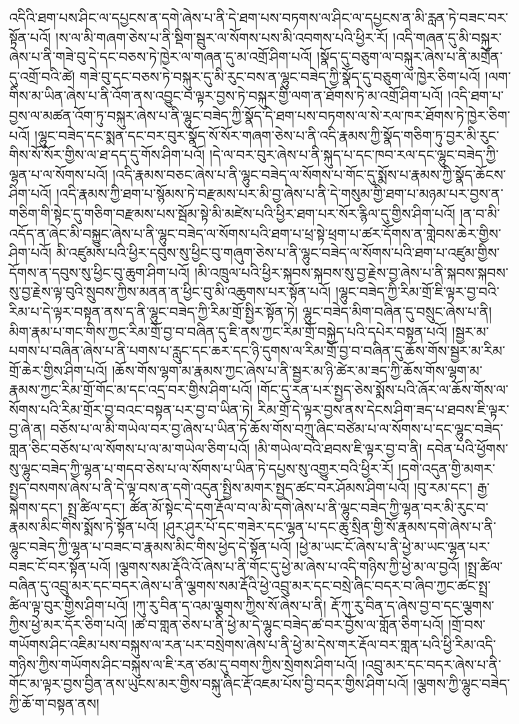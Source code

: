 འདིའི་ཐག་པས་ཤིང་ལ་དཔྱངས་ན་དགེ་ཞེས་པ་ནི་དེ་ཐག་པས་བཏགས་ལ་ཤིང་ལ་དཔྱངས་ན་མི་རླན་ཏེ་བཟང་བར་སྟོན་པའོ། །ས་ལ་མི་གཞག་ཅེས་པ་ནི་སྡིག་སྦུར་ལ་སོགས་པས་མི་འབགས་པའི་ཕྱིར་རོ། །འདི་གཞན་དུ་མི་བསྐུར་ཞེས་པ་ནི་གཟེ་བུ་དེ་དང་བཅས་ཏེ་ཁྱེར་ལ་གཞན་དུ་མ་འགྲོ་ཤིག་པའོ། །སྣོད་དུ་བཅུག་ལ་བསྐུར་ཞེས་པ་ནི་མགྲོན་དུ་འགྲོ་བའི་ཚེ། གཟེ་བུ་དང་བཅས་ཏེ་བསྐུར་དུ་མི་རུང་བས་ན་ལྷུང་བཟེད་ཀྱི་སྣོད་དུ་བཅུག་ལ་ཁྱེར་ཅིག་པའོ། །ལག་གིས་མ་ཡིན་ཞེས་པ་ནི་འོག་ནས་འབྱུང་བ་ལྟར་བྱས་ཏེ་བསྐུར་གྱི་ལག་ན་ཐོགས་ཏེ་མ་འགྲོ་ཤིག་པའོ། །འདི་ཐག་པ་བྱས་ལ་མཚན་འོག་ཏུ་བསྐུར་ཞེས་པ་ནི་ལྷུང་བཟེད་ཀྱི་སྣོད་དེ་ཐག་པས་བཏགས་ལ་སེ་རལ་ཁར་ཐོགས་ཏེ་ཁྱེར་ཅིག་པའོ། །ལྷུང་བཟེད་དང་སྨན་དང་བར་བུར་སྣོད་སོ་སོར་གཞག་ཅེས་པ་ནི་འདི་རྣམས་ཀྱི་སྣོད་གཅིག་ཏུ་བྱར་མི་རུང་གིས་སོ་སོར་གྱིས་ལ་ཐ་དད་དུ་གོས་ཤིག་པའོ། །དེ་ལ་བར་བུར་ཞེས་པ་ནི་སྐུད་པ་དང་ཁབ་རལ་དང་ལྷུང་བཟེད་ཀྱི་ལྷན་པ་ལ་སོགས་པའོ། །འདི་རྣམས་བཅང་ཞེས་པ་ནི་ལྷུང་བཟེད་ལ་སོགས་པ་གོང་དུ་སྨོས་པ་རྣམས་ཀྱི་སྣོད་ཆོངས་ཤིག་པའོ། །འདི་རྣམས་ཀྱི་ཐག་པ་སྙོམས་ཏེ་བརྫམས་པར་མི་བྱ་ཞེས་པ་ནི་དེ་གསུམ་གྱི་ཐག་པ་མཉམ་པར་བྱས་ན་གཅིག་གི་སྟེང་དུ་གཅིག་བརྫམས་པས་སྦོམ་སྟེ་མི་མཛེས་པའི་ཕྱིར་ཐག་པར་སོར་རྙིལ་དུ་གྱིས་ཤིག་པའོ། །ན་བ་མི་འདོད་ན་ཞེང་མི་བསྐྱུང་ཞེས་པ་ནི་ལྷུང་བཟེད་ལ་སོགས་པའི་ཐག་པ་ཕྲ་སྟེ་ཕྲག་པ་ཚར་དོགས་ན་གླེབས་ཆེར་གྱིས་ཤིག་པའོ། མི་འཛུམས་པའི་ཕྱིར་དབུས་སུ་ཕྱིང་བུ་གཞུག་ཅེས་པ་ནི་ལྷུང་བཟེད་ལ་སོགས་པའི་ཐག་པ་འཛུམ་གྱིས་དོགས་ན་དབུས་སུ་ཕྱིང་བུ་ཆུག་ཤིག་པའོ། །མི་འཁྲུལ་པའི་ཕྱིར་སྐབས་སྐབས་སུ་བྱ་རྗེས་བྱ་ཞེས་པ་ནི་སྐབས་སྐབས་སུ་བྱ་རྗེས་ལྟ་བུའི་སྲུབས་ཀྱིས་མནན་ན་ཕྱིང་བུ་མི་འཆུགས་པར་སྟོན་པའོ། །ལྷུང་བཟེད་ཀྱི་རིམ་གྲོ་ཇི་ལྟར་བྱ་བའི་རིམ་པ་དེ་ལྟར་བསྟན་ནས་ད་ནི་ལྷུང་བཟེད་ཀྱི་རིམ་གྲོ་སྤྱིར་སྟོན་ཏེ། ལྷུང་བཟེད་མིག་བཞིན་དུ་བསྲུང་ཞེས་པ་ནི། མིག་རྣམ་པ་གང་གིས་ཀྱང་རིམ་གྲོ་བྱ་བ་བཞིན་དུ་ཇི་ནས་ཀྱང་རིམ་གྲོ་བསྐྱེད་པའི་དཔེར་བསྟན་པའོ། །སྦྱར་མ་པགས་པ་བཞིན་ཞེས་པ་ནི་པགས་པ་རླུང་དང་ཆར་དང་ཉི་དུགས་ལ་རིམ་གྲོ་བྱ་བ་བཞིན་དུ་ཆོས་གོས་སྦྱར་མ་རིམ་གྲོ་ཆེར་གྱིས་ཤིག་པའོ། །ཆོས་གོས་ལྷག་མ་རྣམས་ཀྱང་ཞེས་པ་ནི་སྦྱར་མ་ཉི་ཚེར་མ་ཟད་ཀྱི་ཆོས་གོས་ལྷག་མ་རྣམས་ཀྱང་རིམ་གྲོ་གོང་མ་དང་འདྲ་བར་གྱིས་ཤིག་པའོ། །གོང་དུ་རན་པར་སྤྱད་ཅེས་སྨོས་པའི་ཞོར་ལ་ཆོས་གོས་ལ་སོགས་པའི་རིམ་གྲོར་བྱ་བའང་བསྟན་པར་བྱ་བ་ཡིན་ཏེ། རིམ་གྲོ་དེ་ལྟར་བྱས་ནས་དེངས་ཤིག་ཟད་པ་ཐབས་ཇི་ལྟར་བྱ་ཞེ་ན། བཅོས་པ་ལ་མི་གཡེལ་བར་བྱ་ཞེས་པ་ཡིན་ཏེ་ཆོས་གོས་བཀྲུ་ཞིང་བཙེམ་པ་ལ་སོགས་པ་དང་ལྷུང་བཟེད་གླན་ཅིང་བཅོས་པ་ལ་སོགས་པ་ལ་མ་གཡེལ་ཅིག་པའོ། །མི་གཡེལ་བའི་ཐབས་ཇི་ལྟར་བྱ་བ་ནི། དབེན་པའི་ཕྱོགས་སུ་ལྷུང་བཟེད་ཀྱི་ལྷན་པ་གདབ་ཅེས་པ་ལ་སོགས་པ་ཡིན་ཏེ་དཔྱས་སུ་འགྱུར་བའི་ཕྱིར་རོ། །དགེ་འདུན་གྱི་མགར་སྤྱད་བསགས་ཞེས་པ་ནི་དེ་ལྟ་བས་ན་དགེ་འདུན་སྤྱིས་མགར་སྤྱད་ཚང་བར་ཤོམས་ཤིག་པའོ། །བུ་རམ་དང་། རྒྱ་སྐེགས་དང་། སྤྲ་ཚིལ་དང་། ཚོན་མོ་སྟེང་དེ་དག་རྡོལ་བ་ལ་མི་དགེ་ཞེས་པ་ནི་ལྷུང་བཟེད་ཀྱི་ལྷན་བར་མི་རུང་བ་རྣམས་མིང་གིས་སྨོས་ཏེ་སྟོན་པའོ། །ཤུར་ཤུར་པོ་དང་གཟེར་དང་ལྷན་པ་དང་ཆུ་སྲིན་གྱི་སོ་རྣམས་དགེ་ཞེས་པ་ནི་ལྷུང་བཟེད་ཀྱི་ལྷན་པ་བཟང་བ་རྣམས་མིང་གིས་ཕྱེད་དེ་སྟོན་པའོ། །ཕྱེ་མ་ཡང་ངོ་ཞེས་པ་ནི་ཕྱེ་མ་ཡང་ལྷན་པར་བཟང་ངོ་བར་སྟོན་པའོ། །ལྕགས་སམ་རྡོའི་འོ་ཞེས་པ་ནི་གོང་དུ་ཕྱེ་མ་ཞེས་པ་འདི་གཉིས་ཀྱི་ཕྱེ་མ་ལ་བྱའོ། །སྤྲ་ཚིལ་བཞིན་དུ་འབྲུ་མར་དང་བདར་ཞེས་པ་ནི་ལྕགས་སམ་རྡོའི་ཕྱེ་འབྲུ་མར་དང་བསྲེ་ཞིང་བདར་བ་ཞིབ་ཀྱང་ཚང་སྤྲ་ཚིལ་ལྟ་བུར་གྱིས་ཤིག་པའོ། །ཀུ་རུ་བིན་ད་འམ་ལྕགས་ཀྱིས་སོ་ཞེས་པ་ནི། རྡོ་ཀུ་རུ་བིན་ད་ཞེས་བྱ་བ་དང་ལྕགས་ཀྱིས་ཕྱེ་མར་དོར་ཅིག་པའོ། །ཚ་བ་གླན་ཅེས་པ་ནི་ཕྱེ་མ་དེ་ལྷུང་བཟེད་ཚ་བར་བྱོས་ལ་གློན་ཅིག་པའོ། །གྲོ་བས་གཡོགས་ཤིང་འཇིམ་པས་བསྐུས་ལ་རན་པར་བསྲེགས་ཞེས་པ་ནི་ཕྱེ་མ་དེས་གར་རྡོལ་བར་གླན་པའི་ཕྱི་རིམ་འདི་གཉིས་ཀྱིས་གཡོགས་ཤིང་བསྐུས་ལ་ཇི་རན་ཙམ་དུ་བགས་ཀྱིས་སྲེགས་ཤིག་པའོ། །འབྲུ་མར་དང་བདར་ཞེས་པ་ནི་གོང་མ་ལྟར་བྱས་བྱིན་ནས་ཡུངས་མར་གྱིས་བསྐུ་ཞིང་རྡོ་འཇམ་པོས་བྱི་བདར་གྱིས་ཤིག་པའོ། །ལྕགས་ཀྱི་ལྷུང་བཟེད་ཀྱི་ཆོ་ག་བསྟན་ནས། 